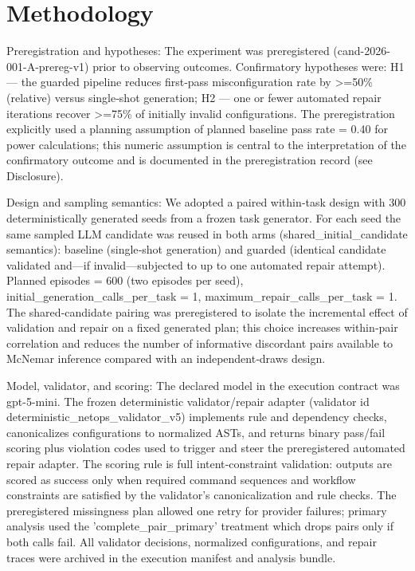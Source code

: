 \documentclass[conference]{IEEEtran}
\begin{document}
\section{Methodology}
Preregistration and hypotheses: The experiment was preregistered (cand-2026-001-A-prereg-v1) prior to observing outcomes. Confirmatory hypotheses were: H1 --- the guarded pipeline reduces first‑pass misconfiguration rate by >=50\% (relative) versus single‑shot generation; H2 --- one or fewer automated repair iterations recover >=75\% of initially invalid configurations. The preregistration explicitly used a planning assumption of planned baseline pass rate = 0.40 for power calculations; this numeric assumption is central to the interpretation of the confirmatory outcome and is documented in the preregistration record (see Disclosure).

Design and sampling semantics: We adopted a paired within‑task design with 300 deterministically generated seeds from a frozen task generator. For each seed the same sampled LLM candidate was reused in both arms (shared\_initial\_candidate semantics): baseline (single‑shot generation) and guarded (identical candidate validated and---if invalid---subjected to up to one automated repair attempt). Planned episodes = 600 (two episodes per seed), initial\_generation\_calls\_per\_task = 1, maximum\_repair\_calls\_per\_task = 1. The shared‑candidate pairing was preregistered to isolate the incremental effect of validation and repair on a fixed generated plan; this choice increases within‑pair correlation and reduces the number of informative discordant pairs available to McNemar inference compared with an independent‑draws design.

Model, validator, and scoring: The declared model in the execution contract was gpt-5-mini. The frozen deterministic validator/repair adapter (validator id deterministic\_netops\_validator\_v5) implements rule and dependency checks, canonicalizes configurations to normalized ASTs, and returns binary pass/fail scoring plus violation codes used to trigger and steer the preregistered automated repair adapter. The scoring rule is full intent‑constraint validation: outputs are scored as success only when required command sequences and workflow constraints are satisfied by the validator's canonicalization and rule checks. The preregistered missingness plan allowed one retry for provider failures; primary analysis used the 'complete\_pair\_primary' treatment which drops pairs only if both calls fail. All validator decisions, normalized configurations, and repair traces were archived in the execution manifest and analysis bundle.
\end{document}
